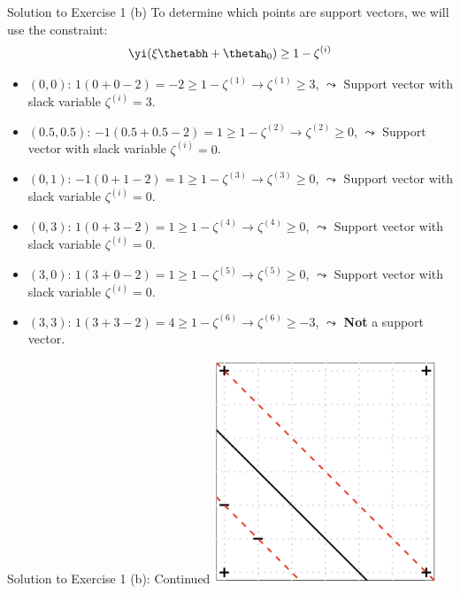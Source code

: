 \documentclass[aspectratio=169]{beamer}
\newcommand{\zetai}{\zeta^{(i)}}
\begin{document}
\begin{frame}{Solution to Exercise 1 (b)}
	To determine which points are support vectors, we will use the constraint:
	\begin{align*}
		\yi (\xi \thetabh + \thetah_0) \geq 1 - \zetai 
	\end{align*}
	
	\begin{itemize}
		\item $(0,0)$: $1 (0 + 0 - 2) = -2 \geq 1 - \zeta^{(1)} \rightarrow \zeta^{(1)} \geq 3$, $\leadsto$ Support vector with slack variable $\zetai = 3$.
		\item $(0.5, 0.5)$: $-1 (0.5 + 0.5 - 2) = 1 \geq 1 - \zeta^{(2)} \rightarrow \zeta^{(2)} \geq 0$, $\leadsto$ Support vector with slack variable $\zetai = 0 $.
		\item $(0, 1)$: $ -1 (0 + 1 - 2) = 1 \geq 1 - \zeta^{(3)} \rightarrow \zeta^{(3)} \geq 0$, $\leadsto$ Support vector with slack variable $\zetai = 0$.
		\item $(0, 3)$: $ 1 (0 + 3 - 2) = 1 \geq 1 - \zeta^{(4)} \rightarrow \zeta^{(4)} \geq 0$, $\leadsto$ Support vector with slack variable $\zetai = 0$.
		\item $(3, 0)$: $ 1 (3 + 0 - 2) = 1 \geq 1 - \zeta^{(5)} \rightarrow \zeta^{(5)} \geq 0$, $\leadsto$ Support vector with slack variable $\zetai = 0$.
		\item $(3, 3)$: $ 1 (3 + 3 - 2) = 4 \geq 1 - \zeta^{(6)} \rightarrow \zeta^{(6)} \geq -3 $, $\leadsto$ \textbf{Not} a support vector.
	\end{itemize}
\end{frame}

\begin{frame}{Solution to Exercise 1 (b): Continued}
	\centering
	\includegraphics[width=0.5\textwidth]{figures/ex_1_b.png}
\end{frame}
\end{document}
